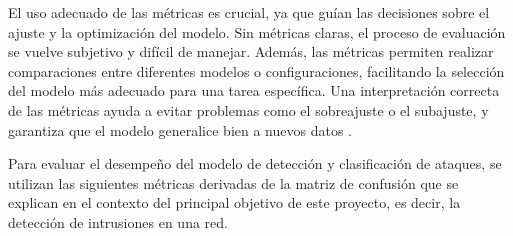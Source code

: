 El uso adecuado de las métricas es crucial, ya que guían las decisiones sobre el ajuste y la optimización del modelo. Sin métricas claras, el proceso de evaluación se vuelve subjetivo y difícil de manejar. Además, las métricas permiten realizar comparaciones entre diferentes modelos o configuraciones, facilitando la selección del modelo más adecuado para una tarea específica. Una interpretación correcta de las métricas ayuda a evitar problemas como el sobreajuste o el subajuste, y garantiza que el modelo generalice bien a nuevos datos \cite{goodfellow2016deep}.

Para evaluar el desempeño del modelo de detección y clasificación de ataques, se utilizan las siguientes métricas derivadas de la matriz de confusión que se explican en el contexto del principal objetivo de este proyecto, es decir, la detección de intrusiones en una red.


